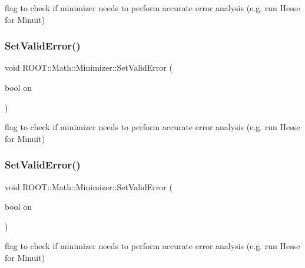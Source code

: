 flag to check if minimizer needs to perform accurate error analysis (e.\+g. run Hesse for Minuit) 

\mbox{\label{classROOT_1_1Math_1_1Minimizer_a31289e6911a86aba956d0050cee2555b}} 
\subsubsection{\texorpdfstring{SetValidError()}{SetValidError()}\hspace{0.1cm}{\footnotesize\ttfamily [2/3]}}
{\footnotesize\ttfamily void R\+O\+O\+T\+::\+Math\+::\+Minimizer\+::\+Set\+Valid\+Error (\begin{DoxyParamCaption}\item[{bool}]{on }\end{DoxyParamCaption})\hspace{0.3cm}{\ttfamily [inline]}}



flag to check if minimizer needs to perform accurate error analysis (e.\+g. run Hesse for Minuit) 

\mbox{\label{classROOT_1_1Math_1_1Minimizer_a31289e6911a86aba956d0050cee2555b}} 
\subsubsection{\texorpdfstring{SetValidError()}{SetValidError()}\hspace{0.1cm}{\footnotesize\ttfamily [3/3]}}
{\footnotesize\ttfamily void R\+O\+O\+T\+::\+Math\+::\+Minimizer\+::\+Set\+Valid\+Error (\begin{DoxyParamCaption}\item[{bool}]{on }\end{DoxyParamCaption})\hspace{0.3cm}{\ttfamily [inline]}}



flag to check if minimizer needs to perform accurate error analysis (e.\+g. run Hesse for Minuit) 

\mbox{\label{classROOT_1_1Math_1_1Minimizer_a8661a2ac86372602f32f97b3d9262421}} 
